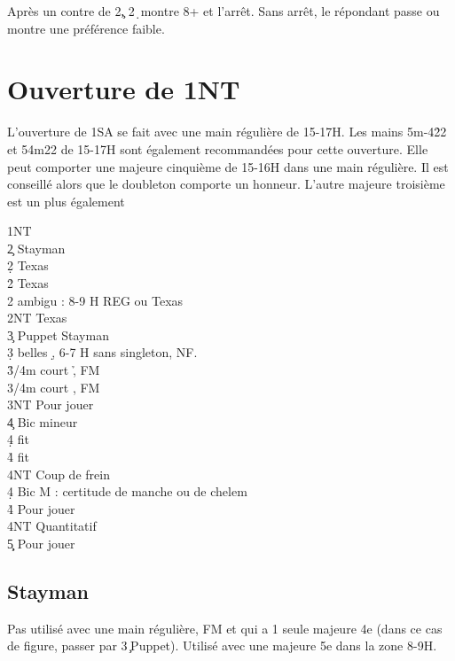 \documentclass[a4paper]{article}
\begin{document}
Après un contre de 2\c , 2\d\ montre 8+ et l'arrêt. Sans arrêt, le répondant passe ou montre une préférence faible.

\section{Ouverture de 1NT}

L’ouverture de 1SA se fait avec une main régulière de 15-17H. 
Les mains 5m-4\h 22 et 54m22 de 15-17H sont également recommandées pour cette 
ouverture.
Elle peut comporter une majeure cinquième de 15-16H dans une main régulière. Il est 
conseillé alors que le doubleton comporte un honneur. L’autre majeure troisième est un plus 
également

\begin{bidtable}
1NT\+\\
2\c \> Stayman\\
2\d \> Texas \h \\
2\h \> Texas \s \\
2\s \> ambigu : 8-9 H REG ou Texas \c \\
2NT \> Texas \d \\
3\c \> Puppet Stayman\\
3\d {} belles \d , 6-7 H sans singleton, NF.\\
3\h {}/4m court \h , FM\\
3\s {}/4m court \s , FM\\
3NT \> Pour jouer\\
4\c \> Bic mineur\+\\
4\d \> fit \d \\
4\h\s \> fit \c \\
4NT \> Coup de frein\-\\
4\d \> Bic M : certitude de manche ou de chelem\\
4\h\s \> Pour jouer\\
4NT \> Quantitatif\\
5\c\d \> Pour jouer\-
\end{bidtable}

\subsection{Stayman}

Pas utilisé avec une main régulière, FM et qui a 1 seule majeure 4e (dans ce cas de figure, passer par 3\c\ Puppet).
Utilisé avec une majeure 5e dans la zone 8-9H.
\end{document}
